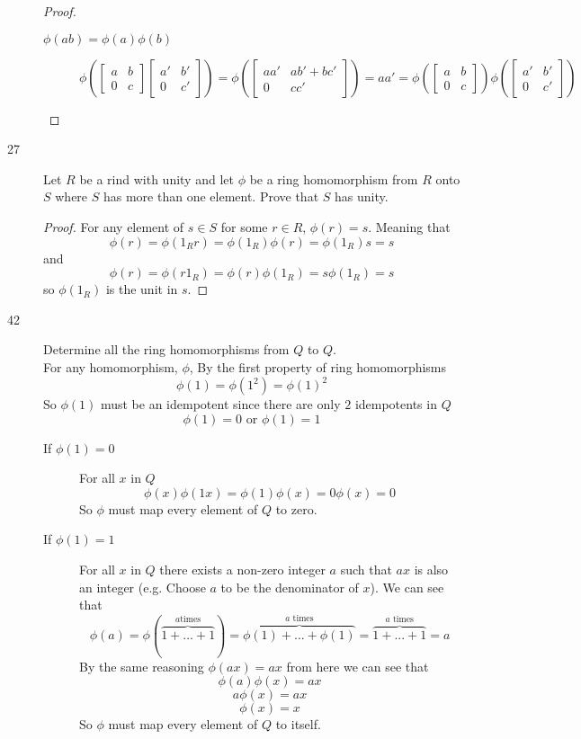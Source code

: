 \documentclass[11pt]{article}
\begin{document}
\begin{description}
\begin{proof}
\begin{description}
		\item[$\phi(ab) = \phi(a)\phi(b)$] 
		$$ \phi(\begin{bmatrix} a & b \\ 0 & c \end{bmatrix}
			\begin{bmatrix} a' & b' \\ 0 & c' \end{bmatrix}) 
		= \phi(\begin{bmatrix} aa' & ab' + bc' \\ 0 & cc' \end{bmatrix}) 
		= aa'
		= \phi(\begin{bmatrix} a & b \\ 0 & c \end{bmatrix})
			\phi(\begin{bmatrix} a' & b' \\ 0 & c' \end{bmatrix}) $$
	\end{description}
	\end{proof}
	\item[27] Let $R$ be a rind with unity and let $\phi$ be a ring
		homomorphism from $R$ onto $S$ where $S$ has more than one
		element. Prove that $S$ has unity.
		\begin{proof}
		For any element of $s \in S$ for some $r \in R$, $\phi(r) = s$.
		Meaning that
		$$ \phi(r) = \phi(1_R r) = \phi(1_R)\phi(r) = \phi(1_R)s = s$$
		and	
		$$ \phi(r) = \phi(r 1_R) = \phi(r)\phi(1_R) = s\phi(1_R) = s$$
		so $\phi(1_R)$ is the unit in $s$.
		\end{proof}
	\item[42]
		Determine all the ring homomorphisms from $Q $ to $Q$.\\
		For any homomorphism, $ \phi$, By the first property of ring homomorphisms 
		$$ \phi(1) = \phi(1^2) = \phi(1)^2 $$
		So $\phi(1)$ must be an idempotent since there are only $2$
		idempotents in $Q$
		$$ \phi(1) = 0 \text{ or } \phi(1) = 1$$
		\begin{description}
		\item[If $\phi(1) = 0$]
			For all $x$ in $Q$
			$$\phi(x) \phi(1x) = \phi(1)\phi(x) = 0\phi(x) = 0$$
			So $\phi$ must map every element of $Q$ to zero.
		\item[If $\phi(1) = 1$]
			For all $x$ in $Q$ there exists a non-zero integer $a$ such that
			$ax$ is also an integer (e.g. Choose $a$ to be the
			denominator of $x$). We can see that
			\[
				\phi(a) = \phi(\overbrace{1+...+1}^{a \text{
					times}})  
				= \overbrace{\phi(1) +...+\phi(1)}^{a \text{ times}} 
				= \overbrace{1 +...+ 1}^{a \text{ times}} 
				= a
			\]
				By the same reasoning $\phi(ax) = ax$ from here
				we can see that
				$$ \phi(a)\phi(x) = ax $$
				$$ a \phi(x) = ax $$
				$$ \phi(x) = x $$
				So $\phi$ must map every element of $Q$ to
				itself.


\end{description}
\end{description}
\end{document}
